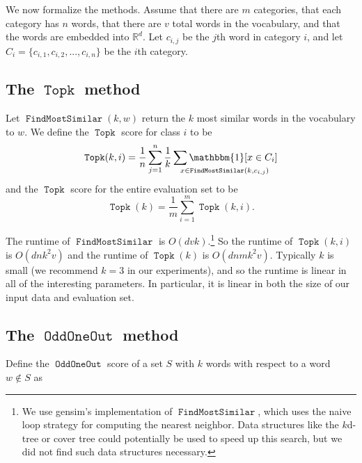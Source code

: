 \documentclass[11pt,a4paper]{article}
\newcommand{\ltwo}[1]{\lVert{#1}\rVert}
\newcommand{\indicator}[1]{\mathbbm{1}\!\left[{#1}\right]}
\newcommand{\R}{\mathbb R}
\DeclareMathOperator*{\argmax}{arg\,max}
\DeclareMathOperator{\FindMostSimilar}{\texttt{FindMostSimilar}}
\DeclareMathOperator{\OddOneOut}{\texttt{OddOneOut}}
\DeclareMathOperator{\topk}{\texttt{Topk}}
\begin{document}
We now formalize the methods. 
Assume that there are $m$ categories, that each category has $n$ words, that there are $v$ total words in the vocabulary, and that the words are embedded into $\R^d$.
Let $c_{i,j}$ be the $j$th word in category $i$,
and let $C_i = \{c_{i,1}, c_{i,2}, ..., c_{i,n}\}$ be the $i$th category.

\subsection{The $\topk$ method}
Let $\FindMostSimilar(k,w)$ return the $k$ most similar words in the vocabulary to $w$.
We define the $\topk$ score for class $i$ to be
\begin{equation}
    \topk(k,i) = \frac{1}{n}\sum_{j=1}^n \frac{1}{k}\sum_{\mathrlap{x \in \FindMostSimilar(k, c_{i,j})}} \indicator{x \in C_i}
\end{equation}
and the $\topk$ score for the entire evaluation set to be
\begin{equation}
    \topk(k) = \frac{1}{m}\sum_{i=1}^m \topk(k,i)
    .
\end{equation}

The runtime of $\FindMostSimilar$ is $O(dvk)$.\footnote{
    We use gensim's implementation of $\FindMostSimilar$,
    which uses the naive loop strategy for computing the nearest neighbor.
    Data structures like the $k$d-tree or cover tree could potentially be used to speed up this search,
    but we did not find such data structures necessary.
}
So the runtime of $\topk(k,i)$ is $O(dnk^2v)$
and the runtime of $\topk(k)$ is $O(dnmk^2v)$.
Typically $k$ is small (we recommend $k=3$ in our experiments),
and so the runtime is linear in all of the interesting parameters.
In particular, it is linear in both the size of our input data and evaluation set.

\subsection{The $\OddOneOut$ method}
Define the $\OddOneOut$ score of a set $S$ with $k$ words with respect to a word $w\not\in S$ as

\end{document}
